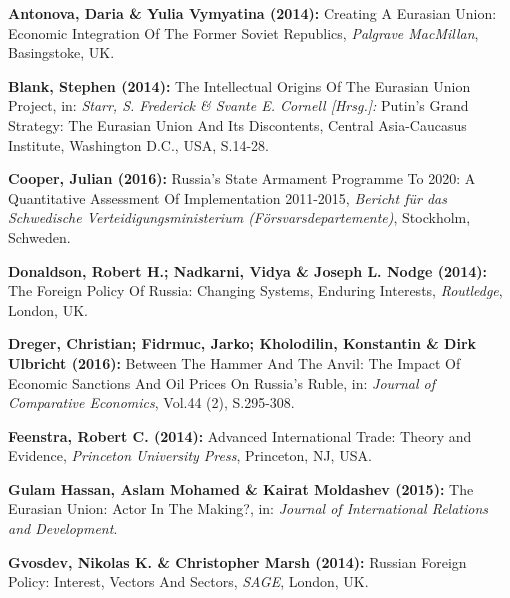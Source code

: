 \documentclass[11pt,a4paper]{article}
\begin{document}
\begin{compactitem}
	
\begin{small}
	
	
	\item [\Rectsteel] \textbf{Antonova, Daria \& Yulia Vymyatina (2014):} Creating A Eurasian Union: Economic Integration Of The Former Soviet Republics, \textsl{Palgrave MacMillan}, Basingstoke, UK.
	
	
	\item [\Rectsteel] \textbf{Blank, Stephen (2014):} The Intellectual Origins Of The Eurasian Union Project, in: \textsl{Starr, S. Frederick \& Svante E. Cornell [Hrsg.]:} Putin's Grand Strategy: The Eurasian Union And Its Discontents, Central Asia-Caucasus Institute, Washington D.C., USA, S.14-28.


	\item [\Rectsteel] \textbf{Cooper, Julian (2016):} Russia's State Armament Programme To 2020: A Quantitative Assessment Of Implementation 2011-2015, \textsl{Bericht für das Schwedische Verteidigungsministerium (Försvars­departemente)}, Stockholm, Schweden.
 

	\item [\Rectsteel] \textbf{Donaldson, Robert H.; Nadkarni, Vidya \& Joseph L. Nodge (2014):} The Foreign Policy Of Russia: Changing Systems, Enduring Interests, \textsl{Routledge}, London, UK.
		
	
	\item [\Rectsteel] \textbf{Dreger, Christian; Fidrmuc, Jarko; Kholodilin, Konstantin \& Dirk Ulbricht (2016):} Between The Hammer And The Anvil: The Impact Of Economic Sanctions And Oil Prices On Russia's Ruble, in: \textsl{Journal of Comparative Economics}, Vol.44 (2), S.295-308.
		
	
	\item [\Rectsteel] \textbf{Feenstra, Robert C. (2014):} Advanced International Trade: Theory and Evidence, \textsl{Princeton University Press}, Princeton, NJ, USA.
	
	
	\item [\Rectsteel] \textbf{Gulam Hassan, Aslam Mohamed \& Kairat Moldashev (2015):} The Eurasian Union: Actor In The Making?, in: \textsl{Journal of International Relations and Development}.
	
	
	\item [\Rectsteel] \textbf{Gvosdev, Nikolas K. \& Christopher Marsh (2014):} Russian Foreign Policy: Interest, Vectors And Sectors, \textsl{SAGE}, London, UK.
	

\end{small}
\end{compactitem}
\end{document}
